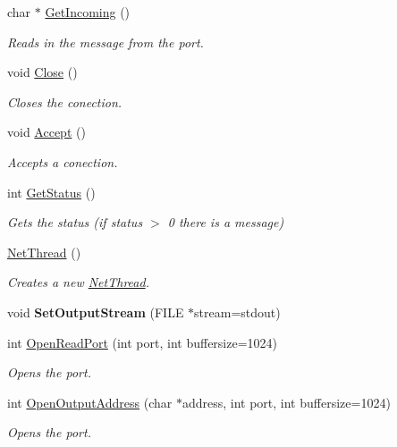 \begin{DoxyCompactItemize}
char $\ast$ \hyperlink{class_net_thread_ac0aa6665ec7d24cf1023c159189de3db}{Get\+Incoming} ()
\begin{DoxyCompactList}\small\item\em Reads in the message from the port. \end{DoxyCompactList}\item 
void \hyperlink{class_net_thread_ad21658535369817214ae60a6b5fe01e9}{Close} ()
\begin{DoxyCompactList}\small\item\em Closes the conection. \end{DoxyCompactList}\item 
void \hyperlink{class_net_thread_ae43eb627a7b606c819ef19f148eb250f}{Accept} ()
\begin{DoxyCompactList}\small\item\em Accepts a conection. \end{DoxyCompactList}\item 
int \hyperlink{class_net_thread_adf5fda96b9b068e3525aca08e1466508}{Get\+Status} ()
\begin{DoxyCompactList}\small\item\em Gets the status (if status $>$ 0 there is a message) \end{DoxyCompactList}\item 
\hyperlink{class_net_thread_a4020c297c2b25730e046ce1a3608510f}{Net\+Thread} ()
\begin{DoxyCompactList}\small\item\em Creates a new \hyperlink{class_net_thread}{Net\+Thread}. \end{DoxyCompactList}\item 
\mbox{\label{class_net_thread_a099bee52f72de55ce912575788740707}} 
void {\bfseries Set\+Output\+Stream} (F\+I\+LE $\ast$stream=stdout)
\item 
int \hyperlink{class_net_thread_a3b51d5da0cf27b5c59c91da22b859312}{Open\+Read\+Port} (int port, int buffersize=1024)
\begin{DoxyCompactList}\small\item\em Opens the port. \end{DoxyCompactList}\item 
int \hyperlink{class_net_thread_ac7b31cfc2b1694765fb2c8c17d776f78}{Open\+Output\+Address} (char $\ast$address, int port, int buffersize=1024)
\begin{DoxyCompactList}\small\item\em Opens the port. \end{DoxyCompactList}\item 

\end{DoxyCompactItemize}

